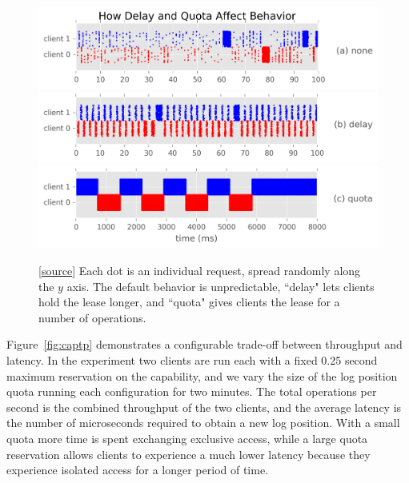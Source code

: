 \begin{figure}[tbp]
\centering
\includegraphics{figures/capdelay-quota-behavior-a.png}
\includegraphics{figures/capdelay-quota-behavior-b.png}
\includegraphics{figures/capdelay-quota-behavior-c.png}
\caption{
[\href{https://github.com/michaelsevilla/malacology-popper/blob/v2.1/experiments/mds-zlog-seq-thruput-v-latency/results-reqdots-kill0-sameclient-capdelay-100-quota-100000/visualize.ipynb}{source}]
Each dot is an individual request, spread randomly along the \(y\) axis. The
default behavior is unpredictable, ``delay" lets clients hold the lease longer,
and ``quota" gives clients the lease for a number of operations.}
\label{fig:capdelay-quota-behavior}
\end{figure}

Figure~\ref{fig:captp} demonstrates a configurable trade-off between throughput
and latency. In the experiment two clients are run each with a fixed 0.25
second maximum reservation on the capability, and we vary the size of the log
position quota running each configuration for two minutes. The total operations
per second is the combined throughput of the two clients, and the average
latency is the number of microseconds required to obtain a new log position. With a
small quota more time is spent exchanging exclusive access, while a large quota
reservation allows clients to experience a much lower latency because they
experience isolated access for a longer period of time.

